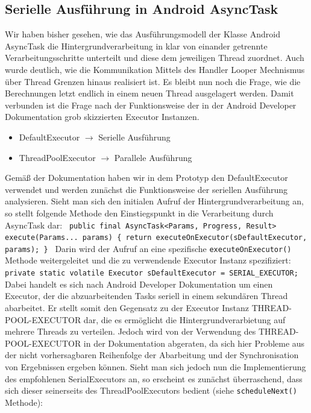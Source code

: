 \documentclass[12pt,oneside,a4paper,bibtotoc,liststotoc]{scrreprt}
\begin{document}
\subsection{Serielle Ausführung in Android AsyncTask}
Wir haben bisher gesehen, wie das Ausführungsmodell der Klasse Android AsyncTask die Hintergrundverarbeitung in klar von einander getrennte Verarbeitungsschritte unterteilt und diese dem jeweiligen Thread zuordnet. Auch wurde deutlich, wie die Kommunikation Mittels des Handler Looper Mechnismus über Thread Grenzen hinaus realisiert ist. Es bleibt nun noch die Frage, wie die Berechnungen letzt endlich in einem neuen Thread ausgelagert werden. Damit verbunden ist die Frage nach der Funktionsweise der in der Android Developer Dokumentation grob skizzierten Executor Instanzen.
\begin{itemize}
\item DefaultExecutor $\rightarrow$ Serielle Ausführung
\item ThreadPoolExecutor $\rightarrow$ Parallele Ausführung
\end{itemize}
Gemäß der Dokumentation haben wir in dem Prototyp den DefaultExecutor verwendet und werden zunächst die Funktionsweise der seriellen Ausführung analysieren. Sieht man sich den initialen Aufruf der Hintergrundverarbeitung an, so stellt folgende Methode den Einstiegspunkt in die Verarbeitung durch AsyncTask dar:\newline
\texttt{\newline
public final AsyncTask<Params, Progress, Result> execute(Params... params) \{\newline
    return executeOnExecutor(sDefaultExecutor, params);\newline
\}\newline
}\newline
Darin wird der Aufruf an eine spezifische \texttt{executeOnExecutor()} Methode weitergeleitet und die zu verwendende Executor Instanz spezifiziert:\newline
\texttt{\newline
private static volatile Executor sDefaultExecutor = SERIAL\_EXECUTOR;\newline
}\newline
Dabei handelt es sich nach Android Developer Dokumentation um einen Executor, der die abzuarbeitenden Tasks seriell in einem sekundären Thread abarbeitet. Er stellt somit den Gegensatz zu der Executor Instanz THREAD-POOL-EXECUTOR dar, die es ermöglicht die Hintergrundverarbietung auf mehrere Threads zu verteilen. Jedoch wird von der Verwendung des THREAD-POOL-EXECUTOR in der Dokumentation abgeraten, da sich hier Probleme aus der nicht vorhersagbaren Reihenfolge der Abarbeitung und der Synchronisation von Ergebnissen ergeben können. Sieht man sich jedoch nun die Implementierung des empfohlenen SerialExecutors an, so erscheint es zunächst überraschend, dass sich dieser seinerseits des ThreadPoolExecutors bedient (siehe \texttt{scheduleNext()} Methode):\newline
\end{document}
